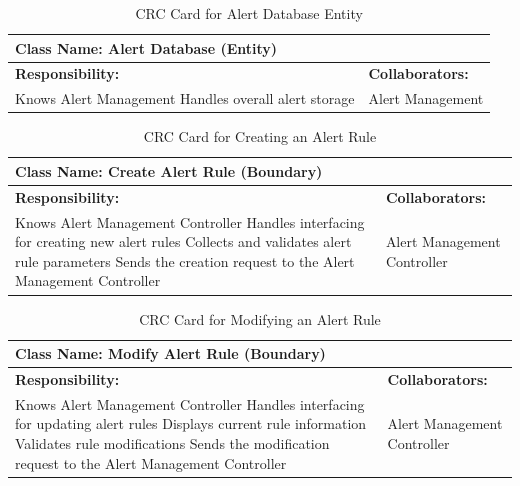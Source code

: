 \documentclass[]{article}
\begin{document}
\begin{table}[H]
    \centering
    \caption{CRC Card for Alert Database Entity}
    \vspace{1mm}
    \begin{tabular}{|p{7.5cm}|p{7.5cm}|}
    \hline 
     \multicolumn{2}{|l|}{\textbf{Class Name: Alert Database (Entity)}} \\
    \hline
    \textbf{Responsibility:} & \textbf{Collaborators:} \\
    \hline
        Knows Alert Management \newline
        Handles overall alert storage \newline
        & 
        Alert Management \\
    \hline
    \end{tabular}
\end{table}
\begin{table}[H]
    \centering
    \caption{CRC Card for Creating an Alert Rule}
    \vspace{1mm}
    \begin{tabular}{|p{7.5cm}|p{7.5cm}|}
    \hline 
      \multicolumn{2}{|l|}{\textbf{Class Name: Create Alert Rule (Boundary)}} \\
    \hline
    \textbf{Responsibility:} & \textbf{Collaborators:} \\
    \hline
		Knows Alert Management Controller \newline
        Handles interfacing for creating new alert rules \newline
        Collects and validates alert rule parameters \newline
        Sends the creation request to the Alert Management Controller \newline     
        & 
        Alert Management Controller \\
    \hline
    \end{tabular}
\end{table}
\begin{table}[H]
    \centering
    \caption{CRC Card for Modifying an Alert Rule}
    \vspace{1mm}
    \begin{tabular}{|p{7.5cm}|p{7.5cm}|}
    \hline 
      \multicolumn{2}{|l|}{\textbf{Class Name: Modify Alert Rule (Boundary)}} \\
    \hline
    \textbf{Responsibility:} & \textbf{Collaborators:} \\
    \hline
		Knows Alert Management Controller \newline
        Handles interfacing for updating alert rules \newline
        Displays current rule information \newline
        Validates rule modifications \newline
        Sends the modification request to the Alert Management Controller \newline
        & 
        Alert Management Controller \\
    \hline
    \end{tabular}
\end{table}
\end{document}
